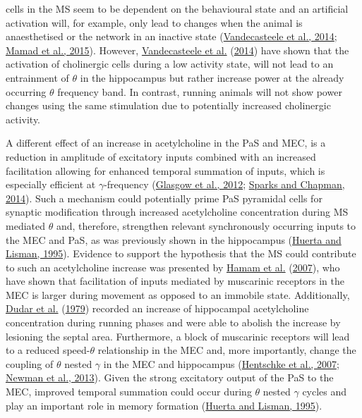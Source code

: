 \documentclass[
  12pt,
  a4paper,
  openany]{book}
\begin{document}
cells in the MS seem to be dependent on the behavioural state and an artificial activation will, for example, only lead to changes when the animal is anaesthetised or the network in an inactive state (\protect\hyperlink{ref-vandecasteele_optogenetic_2014}{Vandecasteele et al., 2014}; \protect\hyperlink{ref-mamad_medial_2015}{Mamad et al., 2015}). However, \protect\hyperlink{ref-vandecasteele_optogenetic_2014}{Vandecasteele et al.} (\protect\hyperlink{ref-vandecasteele_optogenetic_2014}{2014}) have shown that the activation of cholinergic cells during a low activity state, will not lead to an entrainment of \(\theta\) in the hippocampus but rather increase power at the already occurring \(\theta\) frequency band. In contrast, running animals will not show power changes using the same stimulation due to potentially increased cholinergic activity.

A different effect of an increase in acetylcholine in the PaS and MEC, is a reduction in amplitude of excitatory inputs combined with an increased facilitation allowing for enhanced temporal summation of inputs, which is especially efficient at \(\gamma\)-frequency (\protect\hyperlink{ref-glasgow_cholinergic_2012}{Glasgow et al., 2012}; \protect\hyperlink{ref-sparks_contribution_2014}{Sparks and Chapman, 2014}). Such a mechanism could potentially prime PaS pyramidal cells for synaptic modification through increased acetylcholine concentration during MS mediated \(\theta\) and, therefore, strengthen relevant synchronously occurring inputs to the MEC and PaS, as was previously shown in the hippocampus (\protect\hyperlink{ref-huerta_bidirectional_1995}{Huerta and Lisman, 1995}). Evidence to support the hypothesis that the MS could contribute to such an acetylcholine increase was presented by \protect\hyperlink{ref-hamam_cholinergic_2007}{Hamam et al.} (\protect\hyperlink{ref-hamam_cholinergic_2007}{2007}), who have shown that facilitation of inputs mediated by muscarinic receptors in the MEC is larger during movement as opposed to an immobile state. Additionally, \protect\hyperlink{ref-dudar_release_1979}{Dudar et al.} (\protect\hyperlink{ref-dudar_release_1979}{1979}) recorded an increase of hippocampal acetylcholine concentration during running phases and were able to abolish the increase by lesioning the septal area. Furthermore, a block of muscarinic receptors will lead to a reduced speed-\(\theta\) relationship in the MEC and, more importantly, change the coupling of \(\theta\) nested \(\gamma\) in the MEC and hippocampus (\protect\hyperlink{ref-hentschke_muscarinic_2007}{Hentschke et al., 2007}; \protect\hyperlink{ref-newman_cholinergic_2013}{Newman et al., 2013}). Given the strong excitatory output of the PaS to the MEC, improved temporal summation could occur during \(\theta\) nested \(\gamma\) cycles and play an important role in memory formation (\protect\hyperlink{ref-huerta_bidirectional_1995}{Huerta and Lisman, 1995}).
\end{document}
